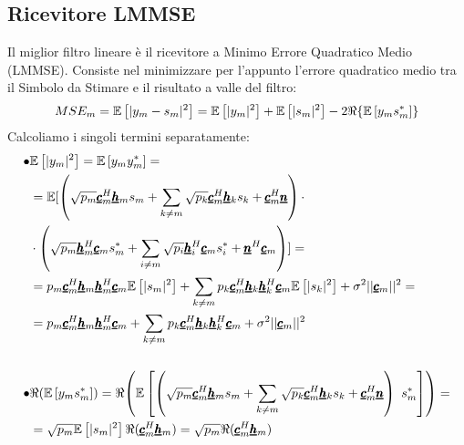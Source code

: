 \subsection{Ricevitore LMMSE}
Il miglior filtro lineare è il ricevitore a Minimo Errore Quadratico Medio (LMMSE).
Consiste nel minimizzare per l'appunto l'errore quadratico medio tra il Simbolo da Stimare e il risultato a valle del filtro:
\begin{equation*}
    MSE_m = \mathbb{E}\left[|y_m - s_m|^2\right] = \mathbb{E}\left[|y_m|^2\right] + \mathbb{E}\left[|s_m|^2\right] - 2\Re\{\mathbb{E}\left[y_m s_m^*\right]\}
\end{equation*}
Calcoliamo i singoli termini separatamente:
\begin{equation*}
    \begin{aligned}
    \bullet & \mathbb{E}\left[|y_m|^2\right] = \mathbb{E}\left[y_m y_m^*\right] = \\
    &= \mathbb{E}[\left(\sqrt{p_m}\pmb{\underline{c}}_m^H \pmb{\underline{h}}_m s_m + \sum_{k \neq m} \sqrt{p_k}\pmb{\underline{c}}_m^H \pmb{\underline{h}}_k s_k + \pmb{\underline{c}}_m^H \pmb{\underline{n}}\right) \cdot \\
    & \cdot \left(\sqrt{p_m} \pmb{\underline{h}}_m^H \pmb{\underline{c}}_m s_m^* + \sum_{i \neq m} \sqrt{p_i}  \pmb{\underline{h}}_i^H  \pmb{\underline{c}}_m s_i^* + \pmb{\underline{n}}^H \pmb{\underline{c}}_m   \right)] = \\
    &= p_m \pmb{\underline{c}}_m^H \pmb{\underline{h}}_m \pmb{\underline{h}}_m^H \pmb{\underline{c}}_m \mathbb{E}\left[|s_m|^2\right] + \sum_{k \neq m} p_k \pmb{\underline{c}}_m^H \pmb{\underline{h}}_k \pmb{\underline{h}}_k^H  \pmb{\underline{c}}_m \mathbb{E}\left[|s_k|^2\right] + \sigma^2 ||\pmb{\underline{c}}_m||^2 = \\
    &= p_m \pmb{\underline{c}}_m^H \pmb{\underline{h}}_m \pmb{\underline{h}}_m^H \pmb{\underline{c}}_m + \sum_{k \neq m} p_k \pmb{\underline{c}}_m^H \pmb{\underline{h}}_k \pmb{\underline{h}}_k^H  \pmb{\underline{c}}_m + \sigma^2 ||\pmb{\underline{c}}_m||^2 \\ \\
    \bullet & \Re{\left(\mathbb{E}\left[y_m s_m^*\right] \right)} = \Re{\left(\mathbb{E}\left[ \left(\sqrt{p_m}\pmb{\underline{c}}_m^H \pmb{\underline{h}}_m s_m + \sum_{k \neq m} \sqrt{p_k}\pmb{\underline{c}}_m^H \pmb{\underline{h}}_k s_k + \pmb{\underline{c}}_m^H \pmb{\underline{n}}\right) \ s_m^*\right] \right)} = \\
    &= \sqrt{p_m} \mathbb{E}\left[|s_m|^2\right] \Re{(\pmb{\underline{c}}_m^H \pmb{\underline{h}}_m)} = \sqrt{p_m} \Re{(\pmb{\underline{c}}_m^H \pmb{\underline{h}}_m)}
    \end{aligned}
\end{equation*}

